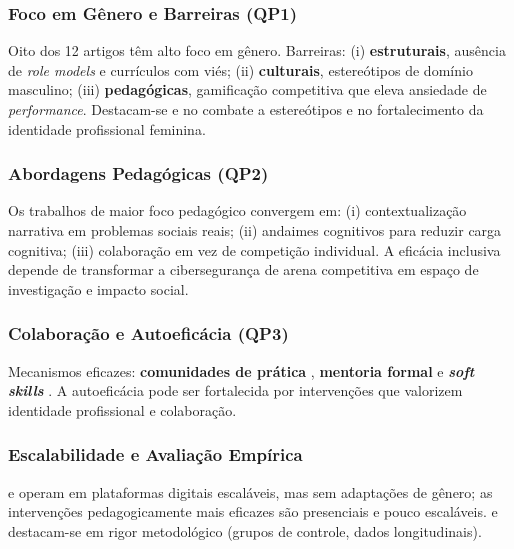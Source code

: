\documentclass[12pt]{article}
\begin{document}
\subsubsection{Foco em Gênero e Barreiras (QP1)}

Oito dos 12 artigos têm alto foco em gênero. Barreiras: (i) \textbf{estruturais}, ausência de \textit{role models} e currículos com viés; (ii) \textbf{culturais}, estereótipos de domínio masculino; (iii) \textbf{pedagógicas}, gamificação competitiva que eleva ansiedade de \textit{performance}. Destacam-se \cite{Costa2025} e \cite{Benson2025} no combate a estereótipos e no fortalecimento da identidade profissional feminina.

\subsubsection{Abordagens Pedagógicas (QP2)}

Os trabalhos de maior foco pedagógico \cite{Costa2023, Costa2025, Casey2023, Thomas2024} convergem em: (i) contextualização narrativa em problemas sociais reais; (ii) andaimes cognitivos para reduzir carga cognitiva; (iii) colaboração em vez de competição individual. A eficácia inclusiva depende de transformar a cibersegurança de arena competitiva em espaço de investigação e impacto social.

\subsubsection{Colaboração e Autoeficácia (QP3)}

Mecanismos eficazes: \textbf{comunidades de prática} \cite{Hogan2025, Tshekiso2025}, \textbf{mentoria formal} \cite{Musuva2025} e \textbf{\textit{soft skills}} \cite{Benson2025}. A autoeficácia pode ser fortalecida por intervenções que valorizem identidade profissional e colaboração.

\subsubsection{Escalabilidade e Avaliação Empírica}

\cite{Tshekiso2025} e \cite{Hogan2025} operam em plataformas digitais escaláveis, mas sem adaptações de gênero; as intervenções pedagogicamente mais eficazes \cite{Casey2023, Thomas2024} são presenciais e pouco escaláveis. \cite{Costa2025} e \cite{Casey2023} destacam-se em rigor metodológico (grupos de controle, dados longitudinais).
\end{document}
